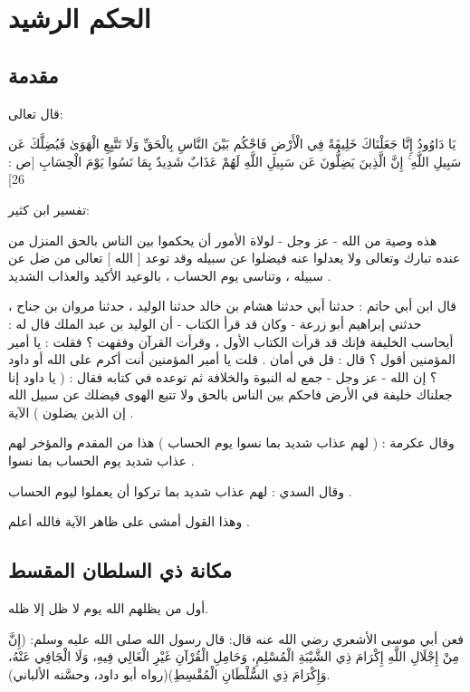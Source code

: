 
\chapter{الحكم الرشيد}

\section{مقدمة}


قال تعالى:


يَا دَاوُودُ إِنَّا جَعَلْنَاكَ خَلِيفَةً فِي الْأَرْضِ فَاحْكُم بَيْنَ النَّاسِ بِالْحَقِّ وَلَا تَتَّبِعِ الْهَوَىٰ فَيُضِلَّكَ عَن سَبِيلِ اللَّهِ ۚ إِنَّ الَّذِينَ يَضِلُّونَ عَن سَبِيلِ اللَّهِ لَهُمْ عَذَابٌ شَدِيدٌ بِمَا نَسُوا يَوْمَ الْحِسَابِ [ص : 26]


تفسير ابن كثير:

هذه وصية من الله - عز وجل - لولاة الأمور أن يحكموا بين الناس بالحق المنزل من عنده تبارك وتعالى ولا يعدلوا عنه فيضلوا عن سبيله وقد توعد [ الله ] تعالى من ضل عن سبيله ، وتناسى يوم الحساب ، بالوعيد الأكيد والعذاب الشديد .

قال ابن أبي حاتم : حدثنا أبي حدثنا هشام بن خالد حدثنا الوليد ، حدثنا مروان بن جناح ، حدثني إبراهيم أبو زرعة - وكان قد قرأ الكتاب - أن الوليد بن عبد الملك قال له : أيحاسب الخليفة فإنك قد قرأت الكتاب الأول ، وقرأت القرآن وفقهت ؟ فقلت : يا أمير المؤمنين أقول ؟ قال : قل في أمان . قلت يا أمير المؤمنين أنت أكرم على الله أو داود ؟ إن الله - عز وجل - جمع له النبوة والخلافة ثم توعده في كتابه فقال : ( يا داود إنا جعلناك خليفة في الأرض فاحكم بين الناس بالحق ولا تتبع الهوى فيضلك عن سبيل الله إن الذين يضلون ) الآية .

وقال عكرمة : ( لهم عذاب شديد بما نسوا يوم الحساب ) هذا من المقدم والمؤخر لهم عذاب شديد يوم الحساب بما نسوا .

وقال السدي : لهم عذاب شديد بما تركوا أن يعملوا ليوم الحساب .

وهذا القول أمشى على ظاهر الآية فالله أعلم .

\section{مكانة ذي السلطان المقسط}

أول من يظلهم الله يوم لا ظل إلا ظله. 

فعن أبي موسى الأشعري رضي الله عنه قال: قال رسول الله صلى الله عليه وسلم: (إِنَّ مِنْ إِجْلَالِ اللَّهِ إِكْرَامَ ذِي الشَّيْبَةِ الْمُسْلِمِ، وَحَامِلِ الْقُرْآنِ غَيْرِ الْغَالِي فِيهِ، وَلَا الْجَافِي عَنْهُ، وَإِكْرَامَ ذِي السُّلْطَانِ الْمُقْسِطِ)(رواه أبو داود، وحسَّنه الألباني).

